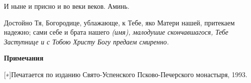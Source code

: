    И ныне и присно и во веки веков. Аминь.



   Достойно Тя, Богородице, ублажающе, к Тебе, яко Матери нашей,
притекаем надежно; сами себе и брата нашего \itshape  (имя)\normalfont{}, малодушие
скончавшагося, Тебе Заступнице и с Тобою Христу Богу предаем
смиренно.

   


 

\bfseries Примечания\normalfont{}


[∗]Печатается по изданию Свято-Успенского Псково-Печерского монастыря, 1993.


\mychapterending




